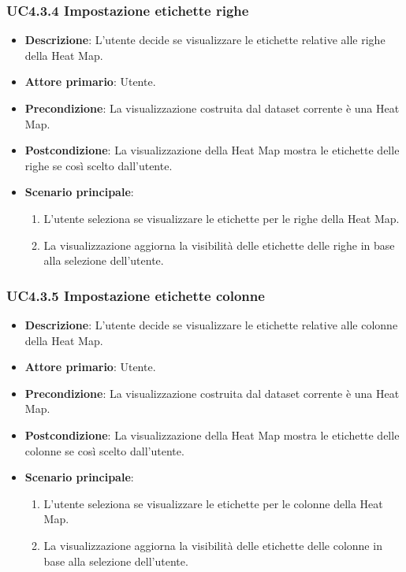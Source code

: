 \subsubsection{UC4.3.4 Impostazione etichette righe}
\label{subsec:uc4.2.1}
\begin{itemize}
    \item \textbf{Descrizione}: L’utente decide se visualizzare le etichette relative alle righe della Heat Map.

    \item \textbf{Attore primario}: Utente.
    
    \item \textbf{Precondizione}:   La visualizzazione costruita dal dataset corrente è una Heat Map.
    \item \textbf{Postcondizione}:  La visualizzazione della Heat Map mostra le etichette delle righe se così scelto dall'utente.

	\item \textbf{Scenario principale}:
        \begin{enumerate}
            \item   L'utente seleziona se visualizzare le etichette per le righe della Heat Map.
            \item   La visualizzazione aggiorna la visibilità delle etichette delle righe in base alla selezione dell'utente.
                    
        \end{enumerate}
\end{itemize}



\subsubsection{UC4.3.5 Impostazione etichette colonne}
\label{subsec:uc4.2.1}
\begin{itemize}
    \item \textbf{Descrizione}: L’utente decide se visualizzare le etichette relative alle colonne della Heat Map.

    \item \textbf{Attore primario}: Utente.
    
    \item \textbf{Precondizione}:   La visualizzazione costruita dal dataset corrente è una Heat Map.
    \item \textbf{Postcondizione}:  La visualizzazione della Heat Map mostra le etichette delle colonne se così scelto dall'utente.

	\item \textbf{Scenario principale}:
        \begin{enumerate}
            \item   L'utente seleziona se visualizzare le etichette per le colonne della Heat Map.
            \item   La visualizzazione aggiorna la visibilità delle etichette delle colonne in base alla selezione dell'utente.
                    
        \end{enumerate}
\end{itemize}


